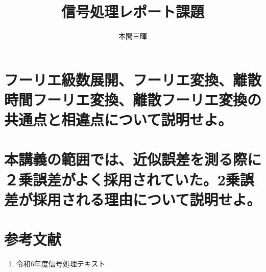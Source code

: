 \documentclass[titlepage,a4paper]{jsarticle}
\title{信号処理レポート課題}
\author{本間三暉}
\begin{document}
\maketitle
\section{フーリエ級数展開、フーリエ変換、離散時間フーリエ変換、離散フーリエ変換の共通点と相違点について説明せよ。}

\section{本講義の範囲では、近似誤差を測る際に２乗誤差がよく採用されていた。2乗誤差が採用される理由について説明せよ。}

\section*{参考文献}
\begin{enumerate}
  \item 令和6年度信号処理テキスト
\end{enumerate}
\end{document}
